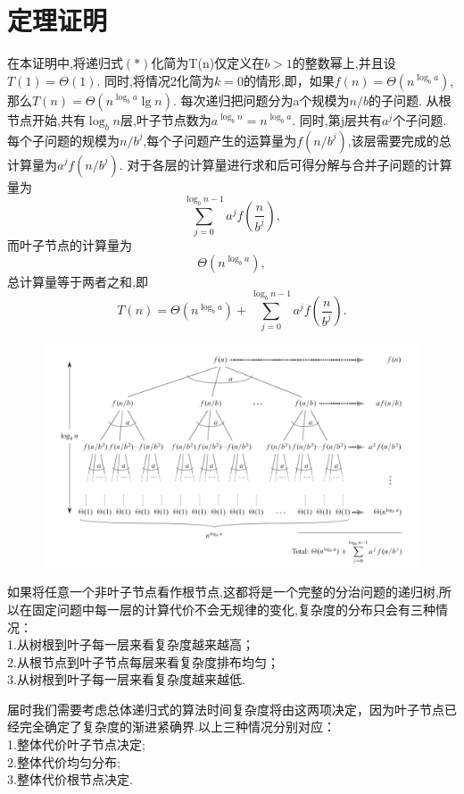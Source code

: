 \documentclass[a4paper]{article}%
\begin{document}
\section{定理证明}
在本证明中,将递归式$(\ast)$化简为T(n)仅定义在$b>1$的整数幂上,并且设$T(1)=\Theta(1)$.
同时,将情况2化简为$k=0$的情形,即，如果$f(n)=\Theta(n^{\log _ba})$,那么$T(n)=\Theta(n^{\log_ba}\lg n)$.
每次递归把问题分为a个规模为$n/b$的子问题.
从根节点开始,共有$\log_bn$层,叶子节点数为$a^{\log_bn}=n^{\log_ba}$.
同时,第j层共有$a^j$个子问题.
每个子问题的规模为$n/b^j$,每个子问题产生的运算量为$f(n/b^j)$,该层需要完成的总计算量为$a^jf(n/b^j)$.
对于各层的计算量进行求和后可得分解与合并子问题的计算量为
\[\sum_{j=0}^{\log_bn-1}a^jf(\frac{n}{b^j}),\]
而叶子节点的计算量为
\[\Theta(n^{\log_ba}),\]
总计算量等于两者之和,即
\[T(n)=\Theta(n^{\log_ba})+\sum_{j=0}^{\log_bn-1}a^jf(\frac{n}{b^j}).\]
\begin{figure}[ht]
    \centering
    \includegraphics[scale=0.4]{图一.png}
    \caption[图一]{}\label{fig-图一}
\end{figure}

如果将任意一个非叶子节点看作根节点,这都将是一个完整的分治问题的递归树,所以在固定问题中每一层的计算代价不会无规律的变化,复杂度的分布只会有三种情况：\\
1.从树根到叶子每一层来看复杂度越来越高；\\
2.从根节点到叶子节点每层来看复杂度排布均匀；\\
3.从树根到叶子每一层来看复杂度越来越低.


届时我们需要考虑总体递归式的算法时间复杂度将由这两项决定，因为叶子节点已经完全确定了复杂度的渐进紧确界.以上三种情况分别对应：\\
1.整体代价叶子节点决定;\\
2.整体代价均匀分布;\\
3.整体代价根节点决定.
\end{document}
